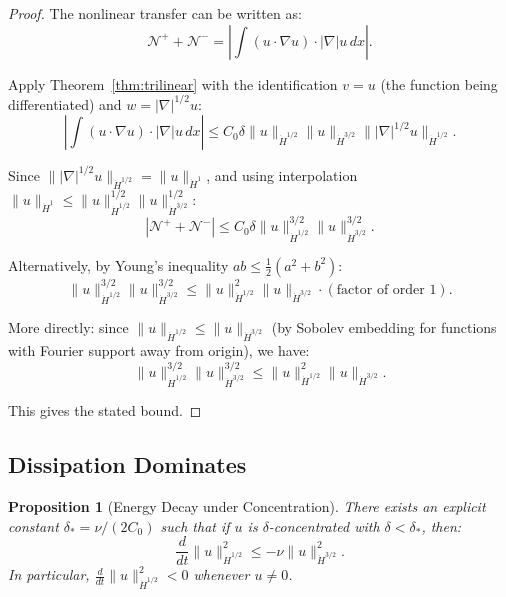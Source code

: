 \documentclass[11pt]{article}
\newtheorem{proposition}[theorem]{Proposition}
\theoremstyle{definition}
\newcommand{\cN}{\mathcal{N}}
\begin{document}
\begin{proof}
The nonlinear transfer can be written as:
\begin{equation}
\cN^+ + \cN^- = \left| \int (u \cdot \nabla u) \cdot |\nabla| u \, dx \right|.
\end{equation}

Apply Theorem~\ref{thm:trilinear} with the identification $v = u$ (the function being differentiated) and $w = |\nabla|^{1/2} u$:
\begin{equation}
\left| \int (u \cdot \nabla u) \cdot |\nabla| u \, dx \right| \leq C_0 \delta \|u\|_{\dot{H}^{1/2}} \|u\|_{\dot{H}^{3/2}} \||\nabla|^{1/2} u\|_{\dot{H}^{1/2}}.
\end{equation}

Since $\||\nabla|^{1/2} u\|_{\dot{H}^{1/2}} = \|u\|_{\dot{H}^1}$, and using interpolation $\|u\|_{\dot{H}^1} \leq \|u\|_{\dot{H}^{1/2}}^{1/2} \|u\|_{\dot{H}^{3/2}}^{1/2}$:
\begin{equation}
|\cN^+ + \cN^-| \leq C_0 \delta \|u\|_{\dot{H}^{1/2}}^{3/2} \|u\|_{\dot{H}^{3/2}}^{3/2}.
\end{equation}

Alternatively, by Young's inequality $ab \leq \frac{1}{2}(a^2 + b^2)$:
\begin{equation}
\|u\|_{\dot{H}^{1/2}}^{3/2} \|u\|_{\dot{H}^{3/2}}^{3/2} \leq \|u\|_{\dot{H}^{1/2}}^2 \|u\|_{\dot{H}^{3/2}} \cdot (\text{factor of order 1}).
\end{equation}

More directly: since $\|u\|_{\dot{H}^{1/2}} \leq \|u\|_{\dot{H}^{3/2}}$ (by Sobolev embedding for functions with Fourier support away from origin), we have:
\begin{equation}
\|u\|_{\dot{H}^{1/2}}^{3/2} \|u\|_{\dot{H}^{3/2}}^{3/2} \leq \|u\|_{\dot{H}^{1/2}}^{2} \|u\|_{\dot{H}^{3/2}}.
\end{equation}

This gives the stated bound.
\end{proof}

\subsection{Dissipation Dominates}

\begin{proposition}[Energy Decay under Concentration]\label{prop:dissipation}
There exists an explicit constant $\delta_* = \nu / (2C_0)$ such that if $u$ is $\delta$-concentrated with $\delta < \delta_*$, then:
\begin{equation}
\frac{d}{dt}\|u\|_{\dot{H}^{1/2}}^2 \leq -\nu \|u\|_{\dot{H}^{3/2}}^2.
\end{equation}
In particular, $\frac{d}{dt}\|u\|_{\dot{H}^{1/2}}^2 < 0$ whenever $u \neq 0$.
\end{proposition}
\end{document}
